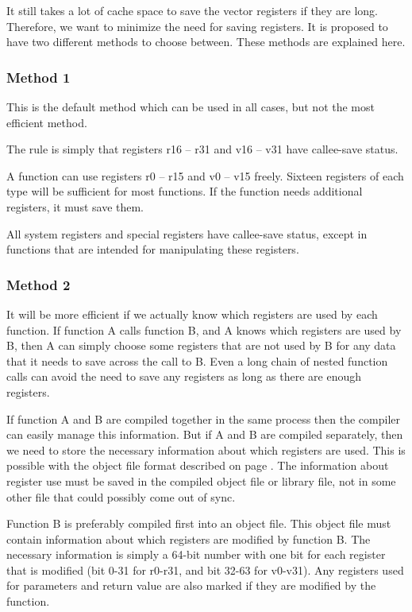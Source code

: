 \documentclass[forwardcom.tex]{subfiles}
\begin{document}
It still takes a lot of cache space to save the vector registers if they are long. Therefore, we want to minimize the need for saving registers. It is proposed to have two different methods to choose between. These methods are explained here. 

\subsubsection{Method 1}
This is the default method which can be used in all cases, but not the most efficient method. 
\vv

The rule is simply that registers r16 – r31 and v16 – v31 have callee-save status.
\vv

A function can use registers r0 – r15 and v0 – v15 freely. Sixteen registers of each type will be sufficient for most functions. If the function needs additional registers, it must save them. 
\vv

All system registers and special registers have callee-save status, except in functions that are intended for manipulating these registers.

\subsubsection{Method 2}
It will be more efficient if we actually know which registers are used by each function. If function A calls function B, and A knows which registers are used by B, then A can simply choose some registers that are not used by B for any data that it needs to save across the call to B. Even a long chain of nested function calls can avoid the need to save any registers as long as there are enough registers. 
\vv

If function A and B are compiled together in the same process then the compiler can easily manage this information. But if A and B are compiled separately, then we need to store the necessary information about which registers are used. This is possible with the object file format described on page \pageref{objectFileFormat}. The information about register use must be saved in the compiled object file or library file, not in some other file that could possibly come out of sync. 
\vv

Function B is preferably compiled first into an object file. This object file must contain information about which registers are modified by function B. The necessary information is simply a 64-bit number with one bit for each register that is modified (bit 0-31 for r0-r31, and bit 32-63 for v0-v31). Any registers used for parameters and return value are also marked if they are modified by the function.
\vv
\end{document}

